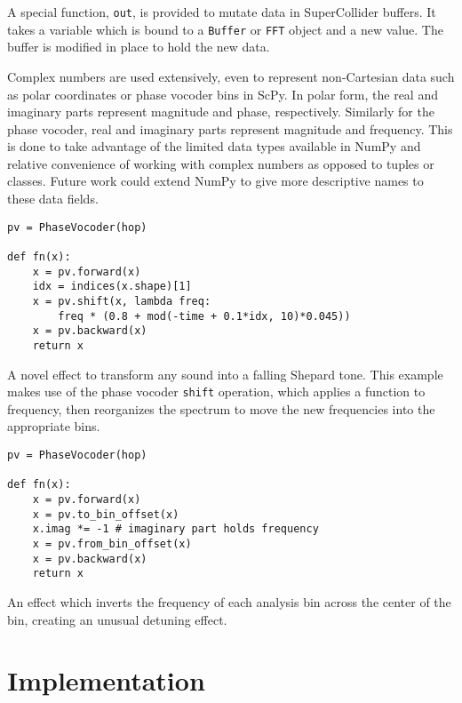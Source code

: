 \documentclass{article}
\begin{document}
A special function, \texttt{out}, is provided to mutate data in SuperCollider buffers. It takes a
variable which is bound to a \texttt{Buffer} or \texttt{FFT} object and a new value. The buffer is
modified in place to hold the new data.

Complex numbers are used extensively, even to represent non-Cartesian data such as polar
coordinates or phase vocoder bins in ScPy. In polar form, the real and imaginary parts represent
magnitude and phase, respectively. Similarly for the phase vocoder, real and imaginary parts
represent magnitude and frequency. This is done to take advantage of the limited data types
available in NumPy and relative convenience of working with complex numbers as opposed to tuples or
classes. Future work could extend NumPy to give more descriptive names to these data fields.

\begin{listing}[ht]
    \begin{verbatim}
pv = PhaseVocoder(hop)

def fn(x):
    x = pv.forward(x)
    idx = indices(x.shape)[1]
    x = pv.shift(x, lambda freq:
        freq * (0.8 + mod(-time + 0.1*idx, 10)*0.045))
    x = pv.backward(x)
    return x
    \end{verbatim}
    \caption{A novel effect to transform any sound into a falling Shepard tone. This example makes
    use of the phase vocoder \texttt{shift} operation, which applies a function to frequency, then
    reorganizes the spectrum to move the new frequencies into the appropriate bins.}
    \label{lst:shepard}
\end{listing}

\begin{listing}[ht]
    \begin{verbatim}
pv = PhaseVocoder(hop)

def fn(x):
    x = pv.forward(x)
    x = pv.to_bin_offset(x)
    x.imag *= -1 # imaginary part holds frequency
    x = pv.from_bin_offset(x)
    x = pv.backward(x)
    return x
    \end{verbatim}
    \caption{An effect which inverts the frequency of each analysis bin across the center of
    the bin, creating an unusual detuning effect.}
    \label{lst:binflipper}
\end{listing}

\section{Implementation}\label{sec:implementation}
\end{document}
